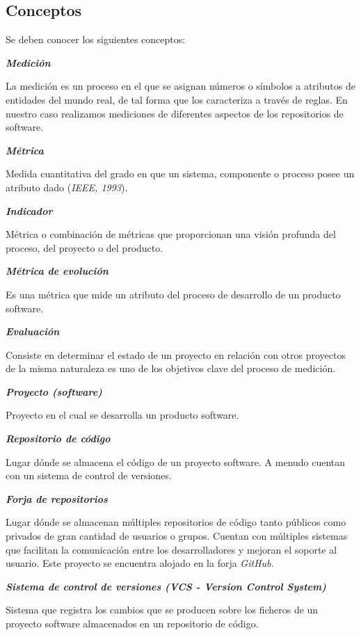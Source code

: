 \subsection{Conceptos}
Se deben conocer los siguientes conceptos:

\textbf{\textit{Medición}}

La medición es un proceso en el que se asignan números o símbolos a atributos de entidades del mundo real, de tal forma que los caracteriza a través de reglas. En nuestro caso realizamos mediciones de diferentes aspectos de los repositorios de software.

\textbf{\textit{Métrica}}

Medida cuantitativa del grado en que un sistema, componente o proceso posee un atributo dado (\textit{IEEE, 1993}).

\textbf{\textit{Indicador}}

Métrica o combinación de métricas que proporcionan una visión profunda del proceso, del proyecto o del producto.

\textbf{\textit{Métrica de evolución}}

Es una métrica que mide un atributo del proceso de desarrollo de un producto software.

\textbf{\textit{Evaluación}}

Consiste en determinar el estado de un proyecto en relación con otros proyectos de la misma naturaleza es uno de los objetivos clave del proceso de medición.

\textbf{\textit{Proyecto (software)}}

Proyecto en el cual se desarrolla un producto software.

\textbf{\textit{Repositorio de código}}

Lugar dónde se almacena el código de un proyecto software. A menudo cuentan con un sistema de control de versiones.

\textbf{\textit{Forja de repositorios}}

Lugar dónde se almacenan múltiples repositorios de código tanto públicos como privados de gran cantidad de usuarios o grupos. Cuentan con múltiples sistemas que facilitan la comunicación entre los desarrolladores y mejoran el soporte al usuario. Este proyecto se encuentra alojado en la forja \textit{GitHub}.

\textbf{\textit{Sistema de control de versiones (\textit{VCS - Version Control System})}}

Sistema que registra los cambios que se producen sobre los ficheros de un proyecto software almacenados en un repositorio de código.

